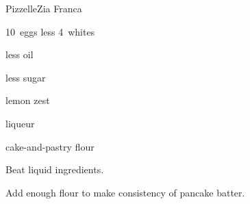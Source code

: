\begin{recipe}{Pizzelle\FIXME}{Zia Franca}{}

\begin{ingredients}
\item 10~eggs less 4~whites
\item {} less  oil
\item {} less  sugar
\item lemon zest
\item {} liqueur
\item cake-and-pastry flour
\end{ingredients}

\begin{directions}
\item Beat liquid ingredients.
\item Add enough flour to make consistency of pancake batter.
\end{directions}

\end{recipe}
